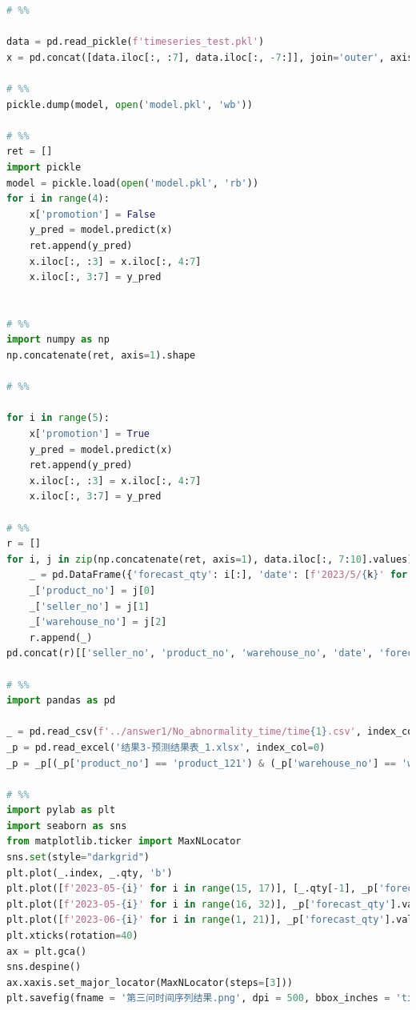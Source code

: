 \documentclass[withoutpreface,bwprint]{cumcmthesis}
\begin{document}
\begin{lstlisting}[language=python]
# %%

data = pd.read_pickle(f'timeseries_test.pkl')
x = pd.concat([data.iloc[:, :7], data.iloc[:, -7:]], join='outer', axis=1)

# %%
pickle.dump(model, open('model.pkl', 'wb'))

# %%
ret = []
import pickle
model = pickle.load(open('model.pkl', 'rb'))
for i in range(4):
    x['promotion'] = False
    y_pred = model.predict(x)
    ret.append(y_pred)
    x.iloc[:, :3] = x.iloc[:, 4:7]
    x.iloc[:, 3:7] = y_pred


# %%
import numpy as np
np.concatenate(ret, axis=1).shape

# %%

for i in range(5):
    x['promotion'] = True
    y_pred = model.predict(x)
    ret.append(y_pred)
    x.iloc[:, :3] = x.iloc[:, 4:7]
    x.iloc[:, 3:7] = y_pred

# %%
r = []
for i, j in zip(np.concatenate(ret, axis=1), data.iloc[:, 7:10].values):
    _ = pd.DataFrame({'forecast_qty': i[:], 'date': [f'2023/5/{k}' for k in range(16, 32)] + [f'2023/6/{k}' for k in range(1, 21)]})
    _['product_no'] = j[0]
    _['seller_no'] = j[1]
    _['warehouse_no'] = j[2]
    r.append(_)
pd.concat(r)[['seller_no', 'product_no', 'warehouse_no', 'date', 'forecast_qty']].to_excel('结果3-预测结果表_1.xlsx')

# %%
import pandas as pd

_ = pd.read_csv(f'../answer1/No_abnormality_time/time{1}.csv', index_col=3)
_p = pd.read_excel('结果3-预测结果表_1.xlsx', index_col=0)
_p = _p[(_p['product_no'] == 'product_121') & (_p['warehouse_no'] == 'wh_1')]

# %%
import pylab as plt
import seaborn as sns
from matplotlib.ticker import MaxNLocator
sns.set(style="darkgrid")
plt.plot(_.index, _.qty, 'b')
plt.plot([f'2023-05-{i}' for i in range(15, 17)], [_.qty[-1], _p['forecast_qty'].values[0]], 'b')
plt.plot([f'2023-05-{i}' for i in range(16, 32)], _p['forecast_qty'].values[:16], 'r')
plt.plot([f'2023-06-{i}' for i in range(1, 21)], _p['forecast_qty'].values[16:], 'r')
plt.xticks(rotation=40)
ax = plt.gca()
sns.despine()
ax.xaxis.set_major_locator(MaxNLocator(steps=[3]))
plt.savefig(fname = '第三问时间序列结果.png', dpi = 500, bbox_inches = 'tight', pad_inches = 0.0)



\end{lstlisting}
\end{document}
